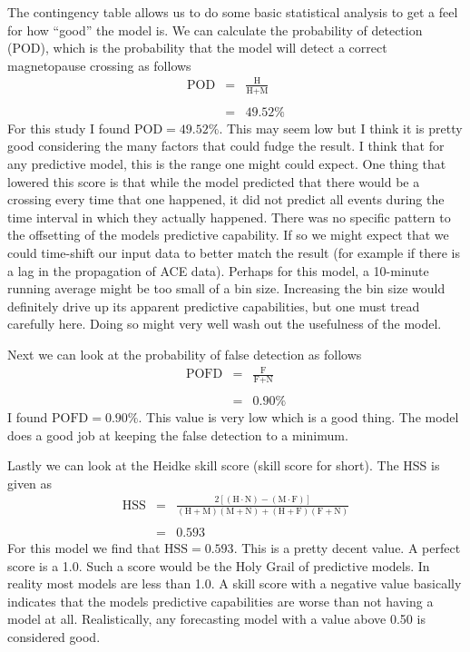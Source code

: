 \documentclass[12pt, letterpaper]{article}
\begin{document}
The contingency table allows us to do some basic statistical analysis to get a feel for how \enquote{good} the model is. We can calculate the probability of detection (POD), which is the probability that the model will detect a correct magnetopause crossing as follows
\begin{eqnarray}
\text{POD} & = & \frac{\text{H}}{\text{H} + \text{M}} \nonumber \\
& & \nonumber \\
& = & 49.52 \%
\end{eqnarray}
For this study I found $\text{POD} = 49.52\%$. This may seem low but I think it is pretty good considering the many factors that could fudge the result. I think that for any predictive model, this is the range one might could expect. One thing that lowered this score is that while the model predicted that there would be a crossing every time that one happened, it did not predict all events during the time interval in which they actually happened. There was no specific pattern to the offsetting of the models predictive capability. If so we might expect that we could time-shift our input data to better match the result (for example if there is a lag in the propagation of ACE data). Perhaps for this model, a 10-minute running average might be too small of a bin size. Increasing the bin size would definitely drive up its apparent predictive capabilities, but one must tread carefully here. Doing so might very well wash out the usefulness of the model.

Next we can look at the probability of false detection as follows
\begin{eqnarray}
\text{POFD} & = & \frac{\text{F}}{\text{F} + \text{N}} \nonumber \\
& & \nonumber \\
& = & 0.90 \%
\end{eqnarray}
I found $\text{POFD} = 0.90\%$. This value is very low which is a good thing. The model does a good job at keeping the false detection to a minimum.

Lastly we can look at the Heidke skill score (skill score for short). The HSS is given as
\begin{eqnarray}
\text{HSS} & = & \frac{2 \left[ \left( \text{H} \cdot \text{N} \right) - \left( \text{M} \cdot \text{F} \right) \right]}{\left( \text{H} + \text{M} \right) \left( \text{M} + \text{N} \right) + \left( \text{H} + \text{F} \right) \left( \text{F} + \text{N} \right)} \nonumber \\
& & \nonumber \\
& = & 0.593
\end{eqnarray}
For this model we find that $\text{HSS} = 0.593$. This is a pretty decent value. A perfect score is a 1.0. Such a score would be the Holy Grail of predictive models. In reality most models are less than 1.0. A skill score with a negative value basically indicates that the models predictive capabilities are worse than not having a model at all. Realistically, any forecasting model with a value above 0.50 is considered good.
\end{document}
